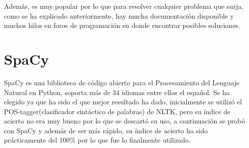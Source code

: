 Además, es muy popular por lo que para resolver cualquier problema que surja, como se ha explicado anteriormente, hay mucha documentación disponible y muchos hilos en foros de programación en donde encontrar posibles soluciones.

\section{SpaCy}
\label{cap:sec:spacy}
SpaCy es una biblioteca de código abierto para el Procesamiento del Lenguaje Natural en Python, soporta más de 34 idiomas entre ellos el español. Se ha elegido ya que ha sido el que mejor resultado ha dado, inicialmente se utilizó el POS-tagger(clasificador sintáctico de palabras) de NLTK, pero su índice de acierto no era muy bueno por lo que se descartó su uso, a continuación se probó con SpaCy y además de ser más rápido, su índice de acierto ha sido prácticamente del 100\% por lo que fue lo finalmente utilizado.




